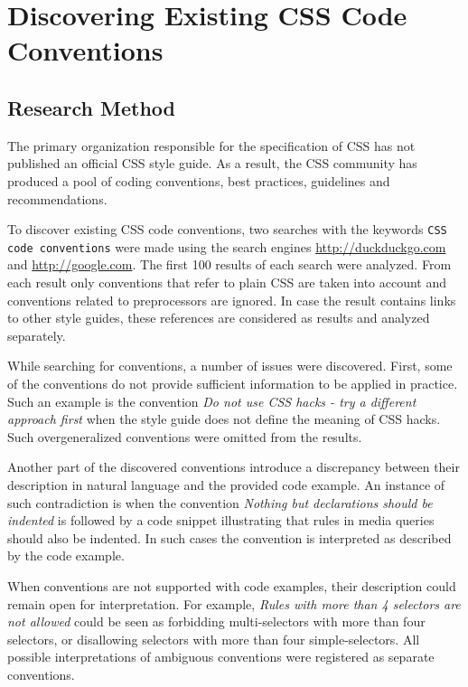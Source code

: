 
\chapter{Discovering Existing CSS Code Conventions}
\label{sec:discovering}

\section{Research Method}

The primary organization responsible for the specification of CSS has not published an official CSS
style guide. As a result, the CSS community has produced a pool of coding conventions, best
practices, guidelines and recommendations.

To discover existing CSS code conventions, two searches with the keywords \texttt{CSS code
conventions} were made using the search engines \url{http://duckduckgo.com} and
\url{http://google.com}. The first 100 results of each search were analyzed. From each result
only conventions that refer to plain CSS are taken into account and conventions related to
preprocessors are ignored. In case the result contains links to other style guides, these
references are considered as results and analyzed separately.

While searching for conventions, a number of issues were discovered. First, some of the
conventions do not provide sufficient information to be applied in practice. Such an example is the
convention \textit{Do not use CSS hacks - try a different approach first} when the style guide does
not define the meaning of CSS hacks. Such overgeneralized conventions were omitted from the results.

Another part of the discovered conventions introduce a discrepancy between their description in
natural language and the provided code example. An instance of such contradiction is when the
convention \textit{Nothing but declarations should be indented} is followed by a code snippet
illustrating that rules in media queries should also be indented. In such cases the convention is
interpreted as described by the code example.

When conventions are not supported with code examples, their description could remain open for
interpretation. For example, \textit{Rules with more than 4 selectors are not allowed} could be seen
as forbidding multi-selectors with more than four selectors, or disallowing selectors with more than
four simple-selectors. All possible interpretations of ambiguous conventions were registered as
separate conventions.


